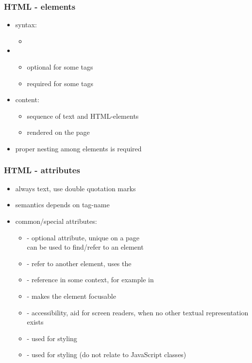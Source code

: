 \begin{frame}[fragile]
\frametitle{HTML - elements}
\color{structure}
\begin{itemize}\color{structure}
  \item syntax:
  \begin{itemize} 
    \item {}
  \end{itemize}
  \item {}
  \begin{itemize} 
    \item optional for some tags
    \item required for some tags
  \end{itemize}
  \item content:
  \begin{itemize} 
    \item sequence of text and HTML-elements
    \item rendered on the page
  \end{itemize}
  \item proper nesting among elements is required
\end{itemize}

\end{frame}

\begin{frame}[fragile]
\frametitle{HTML - attributes}
\color{structure}


\begin{itemize}\color{structure}
  \item always text, use double quotation marks
  \item semantics depends on tag-name
  \item common/special attributes:
  \begin{itemize}\color{structure}
    \item {} - optional attribute, unique on a page\\ can be used to find/refer to an element
    \item {} - refer to another element, uses the 
    \item {} - reference in some context, for example in 
    \item {} - makes the element focusable
    \item {} - accessibility, aid for screen readers, when no other textual representation exists
    \item {} - used for styling
    \item {} - used for styling (do not relate to JavaScript classes)
  \end{itemize}
\end{itemize}
\end{frame}

